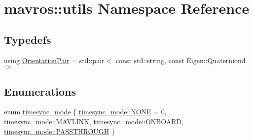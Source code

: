 \hypertarget{namespacemavros_1_1utils}{}\section{mavros\+::utils Namespace Reference}
\label{namespacemavros_1_1utils}
\subsection*{Typedefs}
\begin{DoxyCompactItemize}
\item 
using \mbox{\hyperlink{group__nodelib_ga5f662b76cd833191017cb702a0d49986}{Orientation\+Pair}} = std\+::pair$<$ const std\+::string, const Eigen\+::\+Quaterniond $>$
\end{DoxyCompactItemize}
\subsection*{Enumerations}
\begin{DoxyCompactItemize}
\item 
enum \mbox{\hyperlink{group__mavutils_gac7f53712a7627f397d0eb145c2a16cf7}{timesync\+\_\+mode}} \{ \mbox{\hyperlink{group__mavutils_ggac7f53712a7627f397d0eb145c2a16cf7ab50339a10e1de285ac99d4c3990b8693}{timesync\+\_\+mode\+::\+N\+O\+NE}} = 0, 
\mbox{\hyperlink{group__mavutils_ggac7f53712a7627f397d0eb145c2a16cf7a2b45d810cc872a32caa6e524d97e1bc1}{timesync\+\_\+mode\+::\+M\+A\+V\+L\+I\+NK}}, 
\mbox{\hyperlink{group__mavutils_ggac7f53712a7627f397d0eb145c2a16cf7a1136c8e00bec79c43c2c579ef03e934f}{timesync\+\_\+mode\+::\+O\+N\+B\+O\+A\+RD}}, 
\mbox{\hyperlink{group__mavutils_ggac7f53712a7627f397d0eb145c2a16cf7aeb8f4226b2bcd1848b8945edb9120428}{timesync\+\_\+mode\+::\+P\+A\+S\+S\+T\+H\+R\+O\+U\+GH}}
 \}
\end{DoxyCompactItemize}
